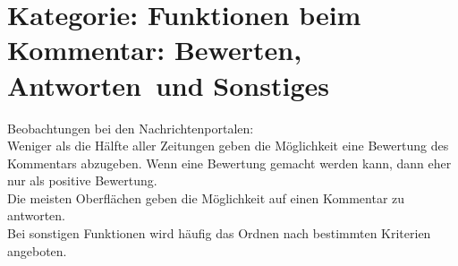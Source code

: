 \section{Kategorie: Funktionen beim Kommentar: \glqq Bewerten\grqq, \glqq Antworten\grqq\ und \glqq Sonstiges\grqq}

Beobachtungen bei den Nachrichtenportalen:\\
Weniger als die Hälfte aller Zeitungen geben die Möglichkeit eine
Bewertung des Kommentars abzugeben. Wenn eine Bewertung gemacht werden kann,
dann eher nur als positive Bewertung.\\
Die meisten Oberflächen geben die Möglichkeit auf einen Kommentar
zu antworten. \\
Bei sonstigen Funktionen wird häufig das
Ordnen nach bestimmten Kriterien angeboten. 


